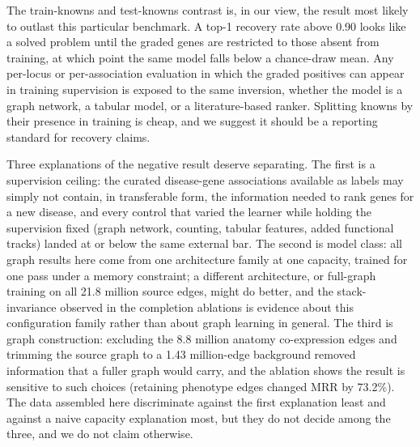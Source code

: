 \documentclass[11pt]{article}
\begin{document}
The train-knowns and test-knowns contrast is, in our view, the result most likely to outlast this particular benchmark. A top-1 recovery rate above 0.90 looks like a solved problem until the graded genes are restricted to those absent from training, at which point the same model falls below a chance-draw mean. Any per-locus or per-association evaluation in which the graded positives can appear in training supervision is exposed to the same inversion, whether the model is a graph network, a tabular model, or a literature-based ranker. Splitting knowns by their presence in training is cheap, and we suggest it should be a reporting standard for recovery claims.

Three explanations of the negative result deserve separating. The first is a supervision ceiling: the curated disease-gene associations available as labels may simply not contain, in transferable form, the information needed to rank genes for a new disease, and every control that varied the learner while holding the supervision fixed (graph network, counting, tabular features, added functional tracks) landed at or below the same external bar. The second is model class: all graph results here come from one architecture family at one capacity, trained for one pass under a memory constraint; a different architecture, or full-graph training on all 21.8 million source edges, might do better, and the stack-invariance observed in the completion ablations is evidence about this configuration family rather than about graph learning in general. The third is graph construction: excluding the 8.8 million anatomy co-expression edges and trimming the source graph to a 1.43 million-edge background removed information that a fuller graph would carry, and the ablation shows the result is sensitive to such choices (retaining phenotype edges changed MRR by 73.2\%). The data assembled here discriminate against the first explanation least and against a naive capacity explanation most, but they do not decide among the three, and we do not claim otherwise.
\end{document}
